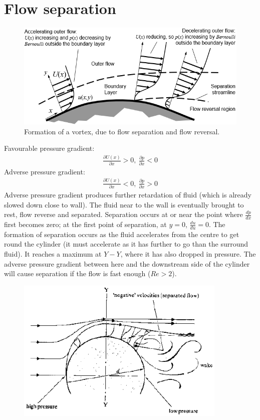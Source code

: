 \documentclass[class=report, crop=false, 12pt,a4paper]{standalone}
\begin{document}
\section{Flow separation}
\begin{figure}[H]
  \centering
  \includegraphics[width = 0.8 \textwidth]{../img/diagram52.png}
  \caption{Formation of a vortex, due to flow separation and flow reversal.}
\end{figure}
Favourable pressure gradient:
\begin{align}
  \frac{\partial U(x)}{\partial x} > 0, \ \frac{\partial p}{\partial x} <0
\end{align}
Adverse pressure gradient:
\begin{align}
  \frac{\partial U(x)}{\partial x} < 0, \ \frac{\partial p}{\partial x} > 0
\end{align}
Adverse pressure gradient produces further retardation of fluid (which is already slowed down close to wall). The fluid near to the wall is eventually brought to rest, flow reverse and separated. Separation occurs at or near the point where $\frac{dp}{dx}$ first becomes zero; at the first point of separation, at $y = 0$, $\frac{du}{du} =0$. The formation of separation occurs as the fluid accelerates from the centre to get round the cylinder (it must accelerate as it has further to go than the surround fluid). It reaches a maximum at $Y-Y$, where it has also dropped in pressure. The adverse pressure gradient between here and the downstream side of the cylinder will cause separation if the flow is fast enough ($Re > 2$).
\begin{figure}[H]
  \centering
  \includegraphics[width = 0.6 \textwidth]{../img/diagram53.png}
\end{figure}
\end{document}
